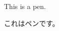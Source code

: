 \documentclass[10.5pt,a4paper]{bxjsarticle}
\begin{document}
This is a pen.

これはペンです。
\end{document}
